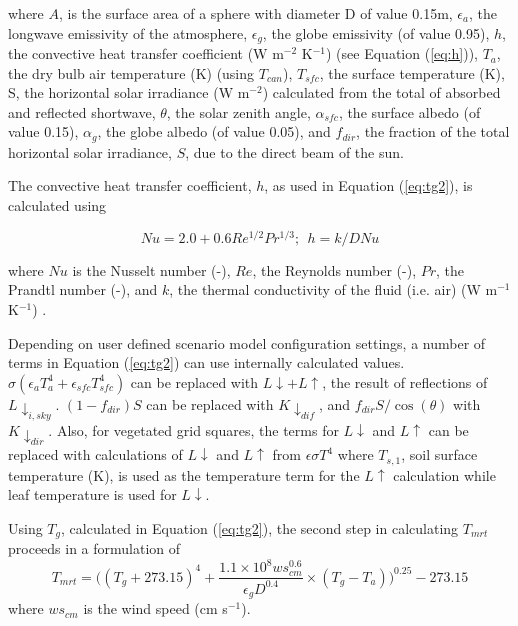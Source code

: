 \documentclass[final,3p,times,authoryear]{elsarticle}
\begin{document}
where $A$, is the surface area of a sphere with diameter D of value 0.15m,
$\epsilon_{a}$, the longwave emissivity of the atmosphere, 
$\epsilon_{g}$, the globe emissivity (of value 0.95), 
$h$, the convective heat transfer coefficient (W m$^{-2}$ K$^{-1}$) (see Equation (\ref{eq:h})), 
$T_{a}$, the dry bulb air temperature (K) (using $T_{can}$), 
$T_{sfc}$, the surface temperature (K), 
S, the horizontal solar irradiance (W m$^{-2}$) calculated from the total of absorbed and reflected shortwave, 
$\theta$, the solar zenith angle, 
$\alpha_{sfc}$, the surface albedo (of value 0.15),  
$\alpha_{g}$, the globe albedo (of value 0.05), and 
$f_{dir}$, the fraction of the total horizontal solar irradiance, 
$S$, due to the direct beam of the sun. 




The convective heat transfer coefficient, $h$, as used in Equation (\ref{eq:tg2}), is calculated using 

\begin{equation}\label{eq:h}
Nu = 2.0 + 0.6Re^{1/2}Pr^{1/3};  ~~h = k / D Nu
\end{equation}

where $Nu$ is the Nusselt number (-),
$Re$, the Reynolds number (-),
$Pr$, the Prandtl number (-), and 
$k$, the thermal conductivity of the fluid (i.e. air) (W m$^{-1}$K$^{-1}$) \citep{Liljegren2008}.



Depending on user defined scenario model configuration settings, a number of terms in Equation (\ref{eq:tg2}) can use internally calculated values. $\sigma (\epsilon_{a} T_{a}^{4} + \epsilon_{sfc} T_{sfc}^{4} )$ can be replaced with $L\downarrow + L\uparrow$, the result of reflections of $L \downarrow_{i,sky}$. $(1-f_{dir})S$ can be replaced with $K \downarrow_{dif}$, and $f_{dir}S/ \cos(\theta)$ with $K \downarrow_{dir}$. Also, for vegetated grid squares, the terms for $L\downarrow$ and $L\uparrow$ can be replaced with calculations of $L\downarrow$ and $L\uparrow$ from $\epsilon \sigma T^{4}$ where $T_{s,1}$, soil surface temperature (K), is used as the temperature term for the $L\uparrow$ calculation while leaf temperature is used for $L\downarrow$. 

Using $T_{g}$, calculated in Equation (\ref{eq:tg2}), the second step in calculating $T_{mrt}$ proceeds in a formulation of \cite{Kantor2011} 
\begin{equation}\label{eq:tmrtbucket}
  T_{mrt} = 
  \bigg(
   (T_{g}+273.15)^{4} + 
    \frac{1.1 \times 10^{8}  ws_{cm}^{0.6}}{\epsilon_{g}  D^{0.4}}
    \times 
     (T_{g}-T_{a})
    \bigg)^{0.25} - 273.15
\end{equation}
 where $ws_{cm}$ is the wind speed (cm s$^{-1}$).
\end{document}
